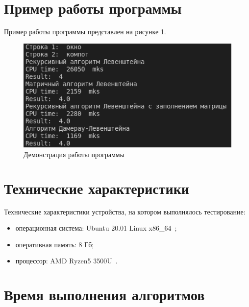 \documentclass[a4paper,oneside,14pt]{extreport}
\begin{document}
\section{Пример работы программы}
Пример работы программы представлен на рисунке \ref{fig:work_example}.
\captionsetup{singlelinecheck=true}
\begin{figure}[H]
	\centering
	\includegraphics[width=0.7\linewidth]{images/work_example}
	\caption{Демонстрация работы программы}
	\label{fig:work_example}
\end{figure}

\section{Технические характеристики}
Технические характеристики устройства, на котором выполнялось тестирование:
\begin{itemize}
	\item операционная система: Ubuntu 20.01 Linux x86\_64~\cite{ubuntu};
	\item оперативная память: 8 Гб;
	\item процессор: AMD Ryzen5 3500U~\cite{processor}.
\end{itemize}

\section{Время выполнения алгоритмов}
\end{document}
